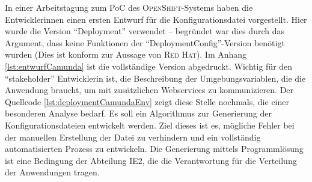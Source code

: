In einer Arbeitstagung zum \ac{PoC} des \textsc{OpenShift}-Systems haben die Entwicklerinnen einen ersten Entwurf für die Konfigurationsdatei vorgestellt. Hier wurde die Version \enquote{Deployment} verwendet -- begründet war dies durch das Argument, dass keine Funktionen der \enquote{DeploymentConfig}-Version benötigt wurden (Dies ist konform zur Aussage von \textsc{Red Hat}\autocite[vgl.][Application\,$\rightarrow$\,Deployments]{red_hat_inc_okd_2019}). Im Anhang \vref{lst:entwurfCamunda} ist die vollständige Version abgedruckt. Wichtig für den \enquote{stakeholder} Entwicklerin ist, die Beschreibung der Umgebungsvariablen, die die Anwendung braucht, um mit zusätzlichen Webservices zu kommunizieren. Der Quellcode \vref{lst:deploymentCamundaEnv} zeigt diese Stelle nochmals, die einer besonderen Analyse bedarf. Es soll ein Algorithmus zur Generierung der Konfigurationsdateien entwickelt werden. Ziel dieses ist es, mögliche Fehler bei der manuellen Erstellung der Datei zu verhindern und ein vollständig automatisierten Prozess zu entwickeln. Die Generierung mittels Programmlösung ist eine Bedingung der Abteilung \ac{IE2}, die die Verantwortung für die Verteilung der Anwendungen tragen.

 

